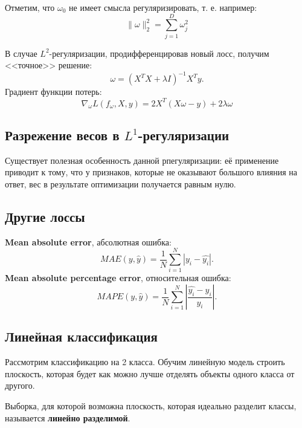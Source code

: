 \documentclass[a4paper, 10pt, openany]{book} %
\begin{document}
 	Отметим, что $\omega_0$ не имеет смысла регуляризировать, т. е. например:
 	\begin{equation*}
 		\|\omega\|^2_2 = \sum_{j=1}^{D} \omega_j^2
 	\end{equation*}

 	В случае $L^2$-регуляризации, продифференцировав новый лосс, получим <<точное>> решение:
	\begin{equation*}
		\omega = (X^TX + \lambda I)^{-1}X^Ty.
	\end{equation*}
	Градиент функции потерь:
	\begin{equation*}
		\nabla_\omega L(f_\omega, X, y) = 2X^T(X\omega - y) + 2\lambda\omega
	\end{equation*}
	
	\subsection{Разрежение весов в $L^1$-регуляризации}
	
	Существует полезная особенность данной рпегуляризации: её применение приводит к тому, что у признаков, которые не оказывают большого влияния на ответ, вес в результате оптимизации получается равным нулю.
	
	\subsection{Другие лоссы}
	
	\textbf{Mean absolute error}, абсолютная ошибка:
	\begin{equation*}
		MAE(y,\widehat{y}) = \frac{1}{N} \sum_{i=1}^{N}|y_i - \widehat{y_i}|.
	\end{equation*} 
	\textbf{Mean absolute percentage error}, относительная ошибка:
	\begin{equation*}
		MAPE(y,\widehat{y}) = \frac{1}{N} \sum_{i=1}^{N}\left|\frac{\widehat{y_i} - y_i}{y_i}\right|.
	\end{equation*}
	
	\subsection{Линейная классификация}
	
	Рассмотрим классификацию на 2 класса. Обучим линейную модель строить плоскость, которая будет как можно лучше отделять объекты одного класса от другого.
	
	Выборка, для которой возможна плоскость, которая идеально разделит классы, называется \textbf{линейно разделимой}.
	
\end{document}
